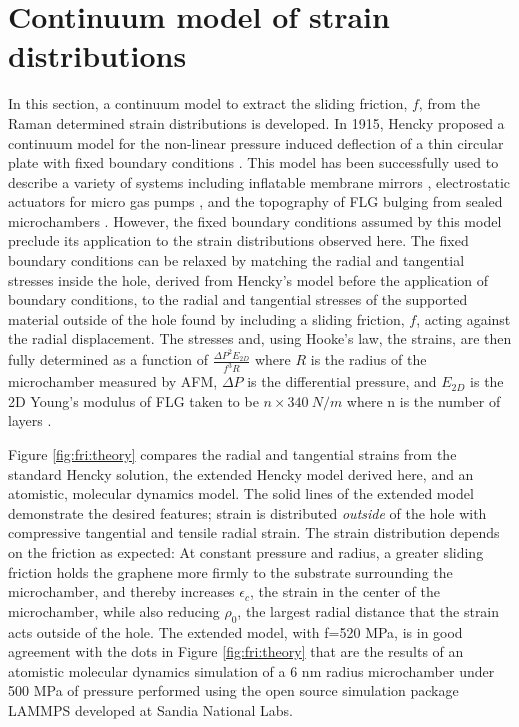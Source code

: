 \section{Continuum model of strain distributions}
In this section, a continuum model to extract the sliding friction, $f$, from the Raman determined strain distributions is developed.
In 1915, Hencky proposed a continuum model for the non-linear pressure induced deflection of a thin circular plate with fixed boundary conditions \cite{Hencky1915,Fichter1997}.
This model has been successfully used to describe a variety of systems including inflatable membrane mirrors \cite{Meinel2000}, electrostatic actuators for micro gas pumps \cite{Zhang2011b}, and the topography of FLG bulging from sealed microchambers \cite{Koenig2011}.
However, the fixed boundary conditions assumed by this model preclude its application to the strain distributions observed here.
The fixed boundary conditions can be relaxed by matching the radial and tangential stresses inside the hole, derived from Hencky's model before the application of boundary conditions, to the radial and tangential stresses of the supported material outside of the hole found by including a sliding friction, $f$, acting against the radial displacement.
The stresses and, using Hooke's law, the strains, are then fully determined as a function of $\frac{\Delta P^2 E_{2D}}{f^3 R}$ where $R$ is the radius of the microchamber measured by AFM, $\Delta P$ is the differential pressure, and $E_{2D}$ is the 2D Young's modulus of FLG taken to be $n \times 340 \ N/m$ where n is the number of layers \cite{Lee2008,Koenig2011}.

Figure \ref{fig:fri:theory} compares the radial and tangential strains from the standard Hencky solution, the extended Hencky model derived here, and an atomistic, molecular dynamics model.
The solid lines of the extended model demonstrate the desired features; strain is distributed \emph{outside} of the hole with compressive tangential and tensile radial strain.
The strain distribution depends on the friction as expected: At constant pressure and radius, a greater sliding friction holds the graphene more firmly to the substrate surrounding the microchamber, and thereby increases $\epsilon_c$, the strain in the center of the microchamber, while also reducing $\rho_0$, the largest radial distance that the strain acts outside of the hole.
The extended model, with f=520 MPa, is in good agreement with the dots in Figure \ref{fig:fri:theory} that are the results of an atomistic molecular dynamics simulation of a 6 nm radius microchamber under 500 MPa of pressure performed using the open source simulation package LAMMPS \cite{plimptonLAMMPS,PlimptonJCP1995} developed at Sandia National Labs.

